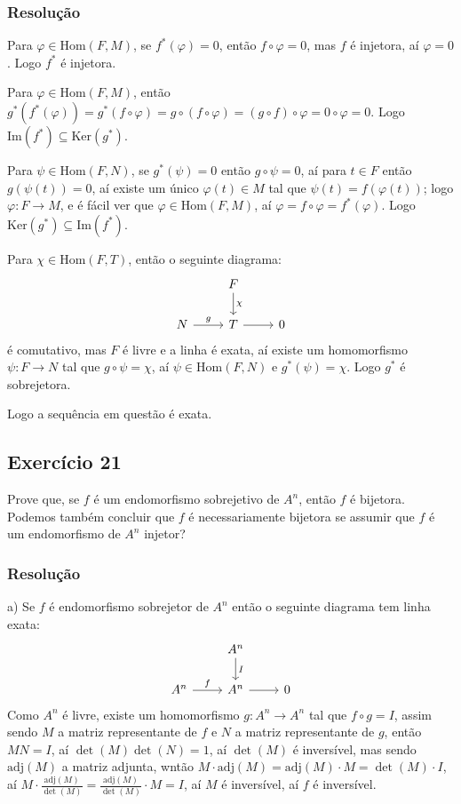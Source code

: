 \documentclass[10pt,a4paper]{article}
\begin{document}
\subsubsection*{Resolução}

Para $\varphi\in\mathrm{Hom}(F,M)$, se $f^*(\varphi)=0$, então $f\circ\varphi=0$, mas $f$ é injetora, aí $\varphi=0$. Logo $f^*$ é injetora.

\medskip
\noindent
Para $\varphi\in\mathrm{Hom}(F,M)$, então $g^*(f^*(\varphi))=g^*(f\circ\varphi)=g\circ(f\circ\varphi)=(g\circ f)\circ\varphi=0\circ\varphi=0$. Logo $\mathrm{Im}(f^*)\subseteq\mathrm{Ker}(g^*)$.

\medskip
\noindent
Para $\psi\in\mathrm{Hom}(F,N)$, se $g^*(\psi)=0$ então $g\circ\psi=0$, aí para $t\in F$ então $g(\psi(t))=0$, aí existe um único $\varphi(t)\in M$ tal que $\psi(t)=f(\varphi(t))$; logo $\varphi:F\rightarrow M$, e é fácil ver que $\varphi\in\mathrm{Hom}(F,M)$, aí $\varphi=f\circ\varphi=f^*(\varphi)$. Logo $\mathrm{Ker}(g^*)\subseteq\mathrm{Im}(f^*)$.

\medskip
\noindent
Para $\chi\in\mathrm{Hom}(F,T)$, então o seguinte diagrama:
\[
\begin{tikzcd}
                 & F \arrow{d}{\chi} &   \\
N \arrow{r}{g} & T \arrow{r}      & 0
\end{tikzcd}
\]
é comutativo, mas $F$ é livre e a linha é exata, aí existe um homomorfismo $\psi:F\rightarrow N$ tal que $g\circ\psi=\chi$, aí $\psi\in\mathrm{Hom}(F,N)$ e $g^*(\psi)=\chi$. Logo $g^*$ é sobrejetora.

\medskip
\noindent
Logo a sequência em questão é exata.

\subsection*{Exercício 21}

Prove que, se $f$ é um endomorfismo sobrejetivo de $A^n$, então $f$ é bijetora. Podemos também concluir que $f$ é necessariamente bijetora se assumir que $f$ é um endomorfismo de $A^n$ injetor?

\subsubsection*{Resolução}

a) Se $f$ é endomorfismo sobrejetor de $A^n$ então o seguinte diagrama tem linha exata:
\[
\begin{tikzcd}
                 & A^n \arrow{d}{I} &   \\
A^n \arrow{r}{f} & A^n \arrow{r}      & 0
\end{tikzcd}
\]
Como $A^n$ é livre, existe um homomorfismo $g:A^n\rightarrow A^n$ tal que $f\circ g=I$, assim sendo $M$ a matriz representante de $f$ e $N$ a matriz representante de $g$, então $MN=I$, aí $\det(M)\det(N)=1$, aí $\det(M)$ é inversível, mas sendo $\mathrm{adj}(M)$ a matriz adjunta, wntão $M\cdot\mathrm{adj}(M)=\mathrm{adj}(M)\cdot M=\det(M)\cdot I$, aí $M\cdot\frac{\mathrm{adj}(M)}{\det(M)}=\frac{\mathrm{adj}(M)}{\det(M)}\cdot M=I$, aí $M$ é inversível, aí $f$ é inversível.
\end{document}
